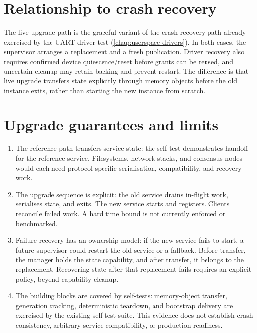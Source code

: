 \section{Relationship to crash recovery}

The live upgrade path is the graceful variant of the crash-recovery path
already exercised by the UART driver test (\autoref{chap:userspace-drivers}). In both cases, the
supervisor arranges a replacement and a fresh publication. Driver recovery also
requires confirmed device quiescence/reset before grants can be reused, and
uncertain cleanup may retain backing and prevent restart. The difference is that live
upgrade transfers state explicitly through memory objects before the old
instance exits, rather than starting the new instance from scratch.

\section{Upgrade guarantees and limits}

\begin{enumerate}
    \item The reference path transfers service state: the self-test
        demonstrates handoff for the reference service. Filesystems, network
        stacks, and consensus nodes would each need protocol-specific
        serialisation, compatibility, and recovery work.

    \item The upgrade sequence is explicit: the old service drains
        in-flight work, serialises state, and exits. The new service starts
        and registers. Clients reconcile failed work. A hard time bound is not currently
        enforced or benchmarked.

    \item Failure recovery has an ownership model: if the new service
        fails to start, a future supervisor could restart the old service or a
        fallback.
        Before transfer, the manager holds the state capability, and after
        transfer, it belongs to the replacement. Recovering state after that
        replacement fails requires an explicit policy, beyond capability
        cleanup.

    \item The building blocks are covered by self-tests: memory-object
        transfer, generation tracking, deterministic teardown, and bootstrap
        delivery are exercised by the existing self-test suite. This evidence
        does not establish crash consistency, arbitrary-service compatibility,
        or production readiness.
\end{enumerate}

\endinput
